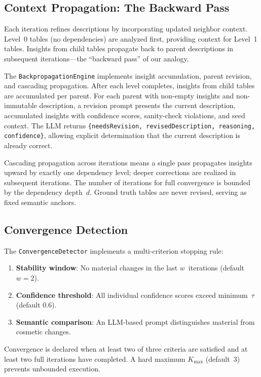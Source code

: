\documentclass[twocolumn]{svjour3}
\begin{document}
\subsection{Context Propagation: The Backward Pass}

Each iteration refines descriptions by incorporating updated neighbor context. Level~0 tables (no dependencies) are analyzed first, providing context for Level~1 tables. Insights from child tables propagate back to parent descriptions in subsequent iterations---the ``backward pass'' of our analogy.

The \texttt{BackpropagationEngine} implements insight accumulation, parent revision, and cascading propagation. After each level completes, insights from child tables are accumulated per parent. For each parent with non-empty insights and non-immutable description, a revision prompt presents the current description, accumulated insights with confidence scores, sanity-check violations, and seed context. The LLM returns \texttt{\{needsRevision, revisedDescription, reasoning, confidence\}}, allowing explicit determination that the current description is already correct.

Cascading propagation across iterations means a single pass propagates insights upward by exactly one dependency level; deeper corrections are realized in subsequent iterations. The number of iterations for full convergence is bounded by the dependency depth~$d$. Ground truth tables are never revised, serving as fixed semantic anchors.

\subsection{Convergence Detection}

The \texttt{ConvergenceDetector} implements a multi-criterion stopping rule:

\begin{enumerate}
    \item \textbf{Stability window}: No material changes in the last $w$~iterations (default $w = 2$).
    \item \textbf{Confidence threshold}: All individual confidence scores exceed minimum~$\tau$ (default 0.6).
    \item \textbf{Semantic comparison}: An LLM-based prompt distinguishes material from cosmetic changes.
\end{enumerate}

Convergence is declared when at least two of three criteria are satisfied and at least two full iterations have completed. A hard maximum $K_{\max}$ (default~3) prevents unbounded execution.
\end{document}
